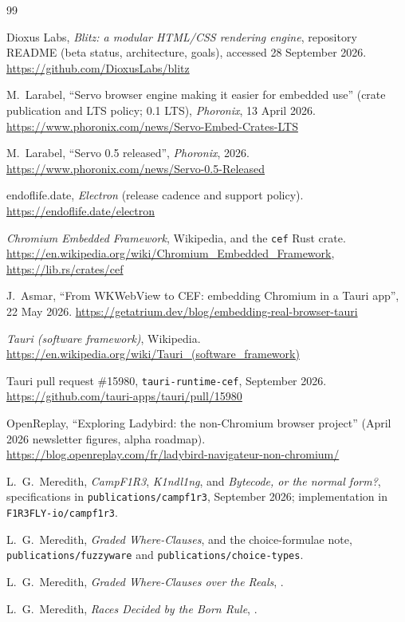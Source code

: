 \documentclass[11pt]{article}
\theoremstyle{definition}
\theoremstyle{remark}
\newcommand{\Camp}{CampF1R3}
\newcommand{\Kind}{K1ndl1ng}
\newcommand{\code}[1]{\texttt{#1}}
\begin{document}
\begin{thebibliography}{99}\small

 Dioxus Labs, \emph{Blitz: a modular HTML/CSS rendering engine},
  repository README (beta status, architecture, goals), accessed 28 September 2026.
  \url{https://github.com/DioxusLabs/blitz}

 M.~Larabel, ``Servo browser engine making it easier for embedded
  use'' (crate publication and LTS policy; 0.1 LTS), \emph{Phoronix}, 13 April 2026.
  \url{https://www.phoronix.com/news/Servo-Embed-Crates-LTS}

 M.~Larabel, ``Servo 0.5 released'', \emph{Phoronix}, 2026.
  \url{https://www.phoronix.com/news/Servo-0.5-Released}

 endoflife.date, \emph{Electron} (release cadence and support
  policy). \url{https://endoflife.date/electron}

 \emph{Chromium Embedded Framework}, Wikipedia, and the \code{cef} Rust
  crate. \url{https://en.wikipedia.org/wiki/Chromium_Embedded_Framework},
  \url{https://lib.rs/crates/cef}

 J.~Asmar, ``From WKWebView to CEF: embedding Chromium in a Tauri
  app'', 22 May 2026. \url{https://getatrium.dev/blog/embedding-real-browser-tauri}

 \emph{Tauri (software framework)}, Wikipedia.
  \url{https://en.wikipedia.org/wiki/Tauri_(software_framework)}

 Tauri pull request \#15980, \code{tauri-runtime-cef}, September
  2026. \url{https://github.com/tauri-apps/tauri/pull/15980}

 OpenReplay, ``Exploring Ladybird: the non-Chromium browser
  project'' (April 2026 newsletter figures, alpha roadmap).
  \url{https://blog.openreplay.com/fr/ladybird-navigateur-non-chromium/}

 L.~G.~Meredith, \emph{\Camp{}}, \emph{\Kind{}}, and \emph{Bytecode,
  or the normal form?}, specifications in \code{publications/campf1r3}, September 2026;
  implementation in \code{F1R3FLY-io/campf1r3}.

 L.~G.~Meredith, \emph{Graded Where-Clauses}, and the choice-formulae
  note, \code{publications/fuzzyware} and \code{publications/choice-types}.

 L.~G.~Meredith, \emph{Graded Where-Clauses over the Reals},
  .

 L.~G.~Meredith, \emph{Races Decided by the Born Rule},
  .

\end{thebibliography}
\end{document}
